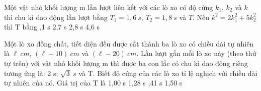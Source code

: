 \begin{vidu}%
Một vật nhỏ khối lượng m lần lượt liên kết với các lò xo có độ cứng $k_1$, $k_2$ và $k$ thì chu kì dao động lần lượt bằng $T_1=1,6\ s$, $T_2=1,8\ s$ và $T$. Nếu $k^2=2k_1^2+5k_2^2$ thì T bằng
\choice
{,1 s}
{2,7 s}
{2,8 s}
{4,6 s}
\end{vidu} %
\begin{vidu} %
 Một lò xo đồng chất, tiết diện đều được cắt thành ba lò xo có chiều dài tự nhiên là $\ell\ cm$, $(\ell -10)\ cm$ và $(\ell-20)\ cm$. Lần lượt gắn mỗi lò xo này (theo thứ tự trên) với vật nhỏ khối lượng m thì được ba con lắc có chu kì dao động riêng tương ứng là: 2 s; $\sqrt{3}\ s$ và T. Biết độ cứng của các lò xo tỉ lệ nghịch với chiều dài tự nhiên của nó. Giá trị của T là
\choice
{1,00 s}
{1,28 s}
{,41 s}
{1,50 s}
\end{vidu} %
